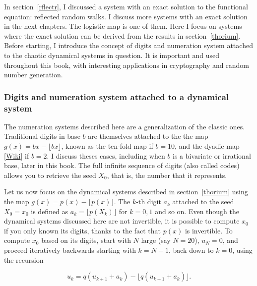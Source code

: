 \documentclass[oneside,10pt]{book}
\begin{document}
In section~\ref{rflectr}, I discussed a system with an exact solution to the functional equation: reflected random walks. I discuss more systems with an exact  solution in the next chapters. The logistic map is one of them. Here I focus on systems where the exact solution can be derived from the results in section~\ref{thorium}. Before starting, I introduce the concept of digits and numeration system attached to the
chaotic dynamical systems in question. It is important and used throughout this book, with interesting applications in cryptography and random number generation.

\subsubsection{Digits and numeration system attached to a dynamical system}\label{digits}

The \textcolor{index}{numeration systems} described here are a generalization of the classic ones. Traditional \textcolor{index}{digits} in base $b$
are themselves attached to the
the map $g(x)= bx - \lfloor bx \rfloor$, known as the \textcolor{index}{ten-fold map} if $b=10$, and the \textcolor{index}{dyadic map} [\href{https://en.wikipedia.org/wiki/Dyadic_transformation}{Wiki}] if  $b=2$.
I discuss theses cases, including when $b$ is a bivariate or \textcolor{index}{irrational base}, later in this book. The full
 infinite sequence of digits (also called \textcolor{index}{codes}) allows you to retrieve the seed $X_0$, that is, the number that it represents.

Let us now focus on the dynamical systems described in section~\ref{thorium} using the map $g(x) = p(x) - \lfloor p(x) \rfloor$.
The $k$-th digit $a_k$ attached to the seed $X_0=x_0$ is defined as $a_k=\lfloor p(X_k)\rfloor$ for $k=0,1$ and so on. Even though the dynamical systems discussed here are not invertible, it is possible to compute $x_0$ if you only known its digits, thanks to the fact that $p(x)$ is invertible. To compute $x_0$ based on its digits, start with $N$ large (say $N=20$), $u_N=0$, and proceed iteratively backwards starting with $k=N-1$, back down to $k=0$, using the recursion

$$u_k=q(u_{k+1} + a_k)-\lfloor q(u_{k+1} + a_k)\rfloor.$$
\end{document}
